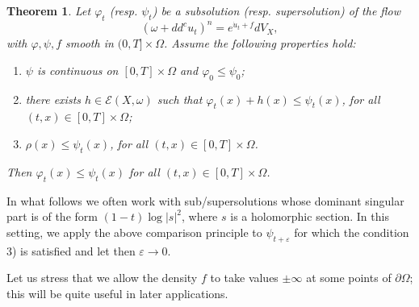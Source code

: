 \documentclass[11pt]{amsart}
\numberwithin{equation}{section}
\newtheorem{theorem}{Theorem}[section]
\newcommand{\f}{\varphi}
\newcommand{\p}{\psi}
\begin{document}
\begin{theorem}\label{thm:pcp}
Let $\varphi_t$ (resp. $\psi_t$) be a subsolution (resp. supersolution) of the flow 
\[
(\omega+dd^c u_t)^n =e^{\dot{u}_t +f} dV_X, 
\]
 with 
$\varphi,\psi,f$ smooth in $(0,T] \times  \Omega$. 
Assume the following properties hold:
\begin{enumerate}
\item $\psi$ is continuous on $[0,T]\times \Omega$ and $\varphi_0\leq \psi_0$;
\item there exists $h\in \mathcal{E}(X,\omega)$ such that $\varphi_t(x)+h(x)\leq \psi_t(x)$, 
for all $(t,x) \in [0,T] \times \Omega$;
\item $\rho(x) \leq \psi_t(x)$, for all $(t,x) \in [0,T] \times \Omega$.
\end{enumerate}
Then $\f_t(x) \leq \p_t(x)$ for all $(t,x) \in [0,T] \times \Omega$.
\end{theorem}



In what follows we often work with sub/supersolutions whose dominant singular part is of the form $(1-t)\log |s|^2$, where $s$ is a holomorphic section.
 In this setting, we apply the above comparison principle to $\psi_{t+\varepsilon}$ 
 for which the condition 3) is satisfied and let then $\varepsilon\to 0$.  

\smallskip

Let us stress that we allow the density $f$ to take values $\pm \infty$ at some points of $\partial \Omega$; this will be  quite useful in later applications.
\end{document}
